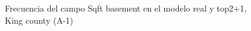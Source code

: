\begin{figure}[H]
    \centering
    
    \caption{Frecuencia del campo Sqft basement en el modelo real y top2+1, King county (A-1)}
    \label{frecuency-top2+1-sqft basement}
\end{figure}